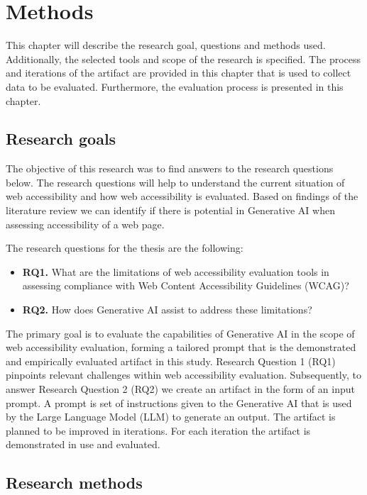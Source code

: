 \chapter{Methods\label{methods}}

This chapter will describe the research goal, questions and methods used. Additionally, the selected tools and scope of the research is specified. The process and iterations of the artifact are provided in this chapter that is used to collect data to be evaluated. Furthermore, the evaluation process is presented in this chapter.

\section{Research goals}

The objective of this research was to find answers to the research questions below. The research questions will help to understand the current situation of web accessibility and how web accessibility is evaluated. Based on findings of the literature review we can identify if there is potential in Generative AI when assessing accessibility of a web page. 

The research questions for the thesis are the following:

\begin{itemize}
    \item \textbf{RQ1.} What are the limitations of web accessibility evaluation tools in assessing compliance with Web Content Accessibility Guidelines (WCAG)?
    \item \textbf{RQ2.} How does Generative AI assist to address these limitations?
\end{itemize}

The primary goal is to evaluate the capabilities of Generative AI in the scope of web accessibility evaluation, forming a tailored prompt that is the demonstrated and empirically evaluated artifact in this study. Research Question 1 (RQ1) pinpoints relevant challenges within web accessibility evaluation. Subsequently, to answer Research Question 2 (RQ2) we create an artifact in the form of an input prompt. A prompt is set of instructions given to the Generative AI that is used by the Large Language Model (LLM) to generate an output. The artifact is planned to be improved in iterations. For each iteration the artifact is demonstrated in use and evaluated.

\section{Research methods}

